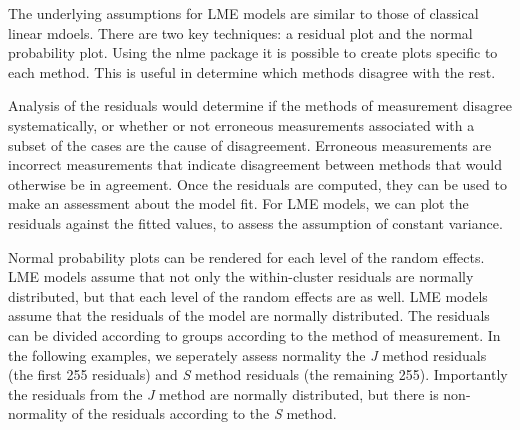 \documentclass[12pt, a4paper]{report}
\theoremstyle{plain}
\theoremstyle{definition}
\theoremstyle{remark}
\begin{document}
The underlying assumptions for LME models are similar to those of classical linear mdoels. There are two key techniques: a residual plot and the normal probability plot. Using the nlme package it is possible to create plots specific to each method. This is useful in determine which methods disagree with the rest.

Analysis of the residuals would determine if the methods of measurement disagree systematically, or whether or not erroneous measurements associated with a subset of the cases are the cause of disagreement. Erroneous measurements are incorrect measurements that indicate disagreement between methods that would otherwise be in agreement.
	Once the residuals are computed, they can be used to make an assessment about the model fit. For LME models, we can plot the residuals against the fitted values, to assess the assumption of constant variance. 
	
	Normal probability plots can be rendered for each level of the random effects.  LME models assume that not only the within-cluster residuals are normally distributed, but that each level of the random effects are as well. LME models assume that the residuals of the model are normally distributed.  The residuals can be divided according to groups according to the method of measurement. In the following examples, we seperately assess normality the \textit{J} method residuals (the first 255 residuals) and \textit{S} method residuals (the remaining 255). Importantly the residuals from the \textit{J} method are normally distributed, but there is non-normality of the residuals according to the \textit{S} method.
	

	
	
\end{document}
